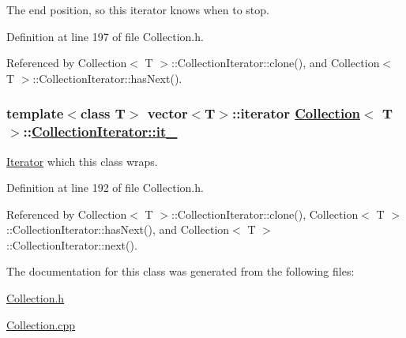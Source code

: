 The end position, so this iterator knows when to stop. 

Definition at line 197 of file Collection.h.

Referenced by Collection$<$ T $>$::Collection\-Iterator::clone(), and Collection$<$ T $>$::Collection\-Iterator::has\-Next().\hypertarget{classCollection_1_1CollectionIterator_r0}{
\subsubsection[it\_\-]{\setlength{\rightskip}{0pt plus 5cm}template$<$class T$>$ vector$<$T$>$::iterator \hyperlink{classCollection}{Collection}$<$ T $>$::\hyperlink{classCollection_1_1CollectionIterator_r0}{Collection\-Iterator::it\_\-}}}
\label{classCollection_1_1CollectionIterator_r0}


\hyperlink{classIterator}{Iterator} which this class wraps. 

Definition at line 192 of file Collection.h.

Referenced by Collection$<$ T $>$::Collection\-Iterator::clone(), Collection$<$ T $>$::Collection\-Iterator::has\-Next(), and Collection$<$ T $>$::Collection\-Iterator::next().

The documentation for this class was generated from the following files:\begin{CompactItemize}
\item 
\hyperlink{Collection_8h}{Collection.h}\item 
\hyperlink{Collection_8cpp}{Collection.cpp}\end{CompactItemize}
